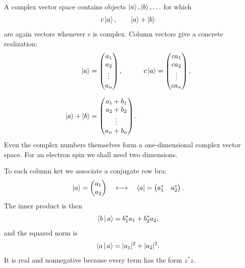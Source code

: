 A complex vector space contains objects \(\left\lvert a\right\rangle,\left\lvert b\right\rangle,\ldots\) for which
\begin{equation}
  c\left\lvert a\right\rangle,
  \qquad
  \left\lvert a\right\rangle+\left\lvert b\right\rangle
\end{equation}
are again vectors whenever \(c\) is complex. Column vectors give a concrete realization:
\begin{equation}
  \begin{aligned}
    \left\lvert a\right\rangle&=
    \begin{pmatrix}
      a_1\\a_2\\ \vdots\\a_n
    \end{pmatrix},
    &
    c\left\lvert a\right\rangle&=
    \begin{pmatrix}
      ca_1\\ca_2\\ \vdots\\ca_n
    \end{pmatrix},\\[0.7em]
    \left\lvert a\right\rangle+\left\lvert b\right\rangle&=
    \begin{pmatrix}
      a_1+b_1\\a_2+b_2\\ \vdots\\a_n+b_n
    \end{pmatrix}.
  \end{aligned}
  \label{eq:l02-vector-operations}
\end{equation}
Even the complex numbers themselves form a one-dimensional complex vector space. For an electron spin we shall need two dimensions.

To each column ket we associate a conjugate row bra:
\begin{equation}
  \left\lvert a\right\rangle=
  \begin{pmatrix}a_1\\a_2\end{pmatrix}
  \quad\longleftrightarrow\quad
  \left\langle a\right\rvert=
  \begin{pmatrix}a_1^*&a_2^*\end{pmatrix}.
  \label{eq:l02-bra-ket-components}
\end{equation}
The inner product is then
\begin{equation}
  \left\langle b\,\middle|\,a\right\rangle=b_1^*a_1+b_2^*a_2,
  \label{eq:l02-inner-product}
\end{equation}
and the squared norm is
\begin{equation}
  \left\langle a\,\middle|\,a\right\rangle=|a_1|^2+|a_2|^2.
  \label{eq:l02-norm}
\end{equation}
It is real and nonnegative because every term has the form \(z^*z\).

